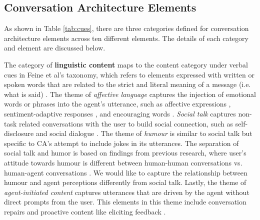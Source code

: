 \documentclass[sigconf,screen,review, anonymous]{acmart}
\newcommand{\cmt}[1]{}%
\begin{document}

\subsection{Conversation Architecture Elements}

As shown in Table \ref{tab:cues}, there are three categories defined for conversation architecture elements across ten different elements. The details of each category and element are discussed below.

The category of \textbf{linguistic content} maps to the content category under verbal cues in Feine et al's taxonomy, which refers to elements expressed with written or spoken words that are related to the strict and literal meaning of a message (i.e. what is said) \cite{feine2019taxonomy}. The theme of \textit{affective language} captures the injection of emotional words or phrases into the agent's utterance, such as affective expressions \cite{seeger2021chatbots}\cmt{[35]}\cite{yang2017perceived}\cmt{[44]}\cite{zhu2022effects}\cmt{[26]}, sentiment-adaptive responses \cite{diederich2019emulating}\cmt{[25]}, and encouraging words \cite{healey2013relating}\cmt{[39]}. \textit{Social talk} captures non-task related conversations with the user to build social connection, such as self-disclosure \cite{lee2020hear}\cmt{[23]} and social dialogue \cite{volkel2021manipulating}\cmt{[68]}\cite{lubold2016effects}\cmt{[86]}. The theme of \textit{humour} is similar to social talk but specific to CA's attempt to include jokes in its utterances. The separation of social talk and humor is based on findings from previous research, where user's attitude towards humour is different between human-human conversations vs. human-agent conversations \cite{clark2019makes}. We would like to capture the relationship between humour and agent perceptions differently from social talk. Lastly, the theme of \textit{agent-initiated content} captures utterances that are driven by the agent without direct prompts from the user. This elements in this theme include conversation repairs \cite{cuadra2021my}\cmt{[67]}\cite{ashktorab2019resilient}\cmt{[88]} and proactive content like eliciting feedback \cite{xiao2021let}\cmt{[73]}.
\end{document}
